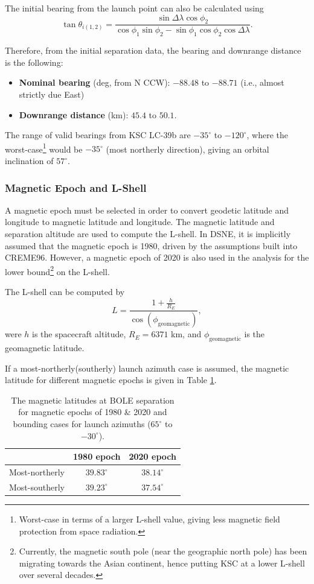\documentclass{hitec}
\begin{document}
The initial bearing from the launch point can also be calculated using
\begin{equation}\label{eq:initial-bearing-shortdist}
	\tan\theta_{i(1,2)} = \frac{\sin\Delta\lambda\cos\phi_2}{\cos\phi_1\sin\phi_2-\sin\phi_1\cos\phi_2\cos\Delta\lambda}.
\end{equation}

Therefore, from the initial separation data, the bearing and downrange distance is the following:
\begin{itemize}
	\item \textbf{Nominal bearing} (deg, from N CCW): $-88.48$ to $-88.71$ (i.e., almost strictly due East)
	\item \textbf{Downrange distance} (km): $45.4$ to $50.1$.
\end{itemize}

The range of valid bearings from KSC LC-39b are $-35^\circ$ to $-120^\circ$, where the worst-case\footnote{Worst-case in terms of a larger L-shell value, giving less magnetic field protection from space radiation.} would be $-35^\circ$ (most northerly direction), giving an orbital inclination of $57^\circ$.

\subsubsection{Magnetic Epoch and L-Shell}\label{sssec:MagneticEpochAndL-Shell}
A magnetic epoch must be selected in order to convert geodetic latitude and longitude to magnetic latitude and longitude. The magnetic latitude and separation altitude are used to compute the L-shell. In DSNE, it is implicitly assumed that the magnetic epoch is 1980, driven by the assumptions built into CREME96. However, a magnetic epoch of 2020 is also used in the analysis for the lower bound\footnote{Currently, the magnetic south pole (near the geographic north pole) has been migrating towards the Asian continent, hence putting KSC at a lower L-shell over several decades.} on the L-shell.

The L-shell can be computed by
\begin{equation}
	L = \frac{1 + \frac{h}{R_E}}{\cos(\phi_{\text{geomagnetic}})},
\end{equation}
were $h$ is the spacecraft altitude, $R_E = 6371$ km, and $\phi_{\text{geomagnetic}}$ is the geomagnetic latitude.

If a most-northerly(southerly) launch azimuth case is assumed, the magnetic latitude for different magnetic epochs is given in Table \ref{tab:magnetic_lat_ranges}.
\begin{table}[h]\centering
	\caption{The magnetic latitudes at BOLE separation for magnetic epochs of 1980 \& 2020 and bounding cases for launch azimuths ($65^\circ$ to $-30^\circ$).}\label{tab:magnetic_lat_ranges}
	\begin{tabular}{|c | c | c |}\hline
		 & 1980 epoch & 2020 epoch  \\\hline
		Most-northerly & $39.83^\circ$ & $38.14^\circ$ \\\hline
		Most-southerly & $39.23^\circ$ & $37.54^\circ$ \\\hline
	\end{tabular}
\end{table}
\end{document}
